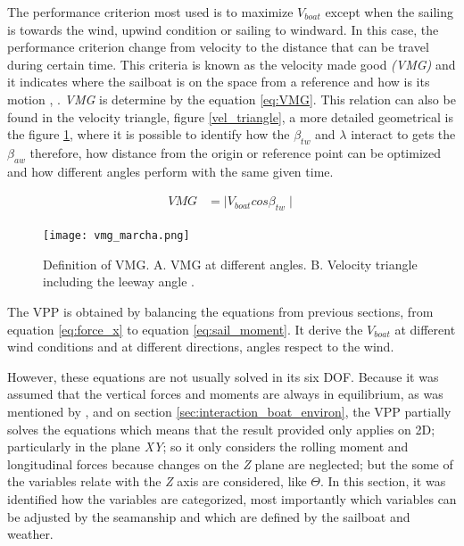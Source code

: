 The performance criterion most used is to maximize $V_{boat}$ except when the sailing is towards the wind, upwind condition or sailing to windward. In this case, the performance criterion change from velocity to the distance that can be travel during certain time.  This criteria is known as the velocity made good \textit{(VMG)} and it indicates where the sailboat is on the space from a reference and how is its motion \cite{larsonprinciples}, \cite{marchajaereo1979} \cite{philpott1993yacht}. \textit{VMG} is determine by the equation \ref{eq:VMG}. This relation can also be found in the velocity triangle, figure \ref{vel_triangle}, a more detailed geometrical is the figure \ref{fig:vmg_marchal_book}, where it is possible to identify how the $\beta_{tw}$ and $\lambda$ interact to gets the $\beta_{aw}$ therefore, how distance from the origin or reference point can be optimized and how different angles perform with the same given time. \par

\begin{equation}\label{eq:VMG}
\begin{aligned}
VMG &=  \mid V_{boat} cos \beta_{tw} \mid 
\end{aligned}
\end {equation}

\begin{figure}
    \centering
    \texttt{[image: vmg\_marcha.png]}
    \caption{Definition of VMG. A. VMG at  different angles. B. Velocity triangle including the leeway angle \cite{marchajaereo1979}.}
    \label{fig:vmg_marchal_book}
\end{figure}

The VPP is obtained by balancing the equations from previous sections, from equation \ref{eq:force_x} to equation \ref{eq:sail_moment}. It derive the $V_{boat}$ at different wind conditions and at different directions, angles respect to the wind. 

However, these equations are not usually solved in its six DOF.  Because it was assumed that the vertical forces and moments are always in equilibrium, as was mentioned by \cite{larsonprinciples}, \cite{fossati2009aero} and on section \ref{sec:interaction_boat_environ},  the VPP partially solves the equations which means that the result provided only applies on 2D; particularly in the plane \textit{XY}; so it only considers the rolling moment and longitudinal forces  because changes on the \textit{Z} plane are neglected; but the some of the variables relate with the \textit{Z} axis are considered, like $\Theta$.  In this section, it was identified how the variables are categorized, most importantly which variables can be adjusted by the seamanship and which are defined by the sailboat and weather. 


